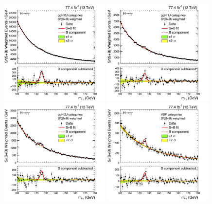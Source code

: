 \begin{figure}[hptb]
  \centering
  \includegraphics[width=0.49\textwidth]{Figures/Results/MassPlot_0J.png}
  \includegraphics[width=0.49\textwidth]{Figures/Results/MassPlot_1J.png} \\
  \includegraphics[width=0.49\textwidth]{Figures/Results/MassPlot_2J.png}
  \includegraphics[width=0.49\textwidth]{Figures/Results/MassPlot_VBF.png}

\end{figure}
